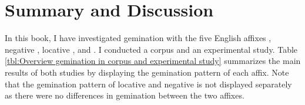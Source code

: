\chapter{Summary and Discussion} \label{Conclusion}

In this book, I have investigated gemination with the five English affixes , negative , locative ,  and . I conducted a corpus and an experimental study. 
Table \ref{tbl:Overview gemination in corpus and experimental study} summarizes the main results of both studies by displaying the gemination pattern of each affix. Note that the gemination pattern of locative and negative  is not displayed separately as there were no differences in gemination between the two affixes. 





\begin{table*}[b!]
	\caption{Overview of gemination in corpus and experimental study}
	\label{tbl:Overview gemination in corpus and experimental study}
	
 
		\renewcommand{\arraystretch}{1.5}
 
\end{table*}


